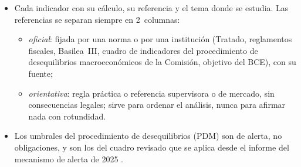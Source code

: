 \documentclass[11pt]{article}
\begin{document}
\begin{itemize}
\item Cada indicador con su cálculo, su referencia y el tema donde se estudia. Las referencias se separan siempre en 2~columnas:
  \begin{itemize}
  \item \emph{oficial}: fijada por una norma o por una institución (Tratado, reglamentos fiscales, Basilea~III, cuadro de indicadores del procedimiento de desequilibrios macroeconómicos de la Comisión, objetivo del BCE), con su fuente;
  \item \emph{orientativa}: regla práctica o referencia supervisora o de mercado, sin consecuencias legales; sirve para ordenar el análisis, nunca para afirmar nada con rotundidad.
  \end{itemize}
\item Los umbrales del procedimiento de desequilibrios (PDM) son de alerta, no obligaciones, y son los del cuadro revisado que se aplica desde el informe del mecanismo de alerta de 2025 \parencite{CE2025AMR2026,Eurostat2025MIP}.
\end{itemize}
\end{document}
